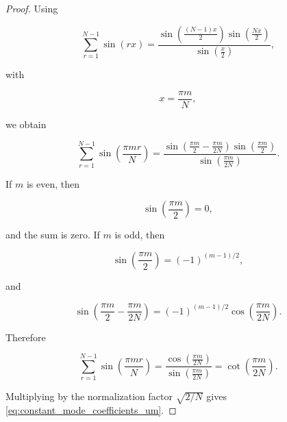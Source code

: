 \documentclass[11pt]{amsart}
\numberwithin{equation}{section}
\theoremstyle{plain}
\theoremstyle{definition}
\theoremstyle{remark}
\begin{document}
\begin{proof}
Using

\begin{equation}
\sum_{r=1}^{N-1}\sin(rx)
=
\frac{
\sin\left(\frac{(N-1)x}{2}\right)
\sin\left(\frac{Nx}{2}\right)
}{
\sin\left(\frac{x}{2}\right)
},
\label{eq:finite_sine_sum_identity}
\end{equation}

with

\begin{equation}
x=\frac{\pi m}{N},
\end{equation}

we obtain

\begin{equation}
\sum_{r=1}^{N-1}
\sin\left(\frac{\pi mr}{N}\right)
=
\frac{
\sin\left(\frac{\pi m}{2}-\frac{\pi m}{2N}\right)
\sin\left(\frac{\pi m}{2}\right)
}{
\sin\left(\frac{\pi m}{2N}\right)
}.
\end{equation}

If \(m\) is even, then

\begin{equation}
\sin\left(\frac{\pi m}{2}\right)=0,
\end{equation}

and the sum is zero.
If \(m\) is odd, then

\begin{equation}
\sin\left(\frac{\pi m}{2}\right)=(-1)^{(m-1)/2},
\end{equation}

and

\begin{equation}
\sin\left(\frac{\pi m}{2}-\frac{\pi m}{2N}\right)
=
(-1)^{(m-1)/2}
\cos\left(\frac{\pi m}{2N}\right).
\end{equation}

Therefore

\begin{equation}
\sum_{r=1}^{N-1}
\sin\left(\frac{\pi mr}{N}\right)
=
\frac{
\cos\left(\frac{\pi m}{2N}\right)
}{
\sin\left(\frac{\pi m}{2N}\right)
}
=
\cot\left(\frac{\pi m}{2N}\right).
\label{eq:sine_sum_odd_even}
\end{equation}

Multiplying by the normalization factor \(\sqrt{2/N}\) gives
\eqref{eq:constant_mode_coefficients_um}.
\end{proof}
\end{document}
